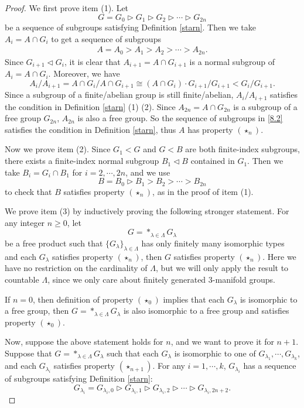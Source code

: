\documentclass{amsart}
\numberwithin{equation}{section}
\theoremstyle{definition}
\begin{document}
\begin{proof}
We first prove item (1). Let 
$$G=G_0\vartriangleright G_1\vartriangleright G_2\vartriangleright \cdots \vartriangleright G_{2n}$$
be a sequence of subgroups satisfying Definition \ref{starn}. Then we take $A_i=A\cap G_i$ to get a sequence of subgroups
\begin{align}\label{8.2}
A=A_0>A_1>A_2>\cdots>A_{2n}.
\end{align}
Since $G_{i+1}\vartriangleleft  G_i$, it is clear that $A_{i+1}=A\cap G_{i+1}$ is a normal subgroup of $A_i=A\cap G_i$.
Moreover, we have
$$A_i/A_{i+1}=A\cap G_i/A\cap G_{i+1}\cong (A\cap G_i)\cdot G_{i+1}/G_{i+1}<G_i/G_{i+1}.$$
Since a subgroup of a finite/abelian group is still finite/abelian, $A_i/A_{i+1}$ satisfies the condition in Definition \ref{starn} (1) (2). Since $A_{2n}=A\cap G_{2n}$ is a subgroup of a free group $G_{2n}$, $A_{2n}$ is also a free group. So the sequence of subgroups in \eqref{8.2} satisfies the condition in Definition \ref{starn}, thus $A$ has property $(\star_n)$.

Now we prove item (2). Since $G_1<G$ and $G<B$ are both finite-index subgroups, there exists a finite-index normal subgroup $B_1\vartriangleleft B$ contained in $G_1$. Then we take $B_i=G_i\cap B_1$ for $i=2,\cdots,2n$, and we use 
$$B=B_0\vartriangleright B_1>B_2>\cdots>B_{2n}$$ 
to check that $B$ satisfies property $(\star_n)$, as in the proof of item (1). 

We prove item (3) by inductively proving the following stronger statement. For any integer $n\geq 0$, let $$G=*_{\lambda\in \Lambda}G_{\lambda}$$
be a free product such that $\{G_{\lambda}\}_{\lambda\in \Lambda}$ has only finitely many isomorphic types and each $G_{\lambda}$ satisfies property $(\star_n)$, then $G$ satisfies property $(\star_n)$. Here we have no restriction on the cardinality of $\Lambda$, but we will only apply the result to countable $\Lambda$, since we only care about finitely generated $3$-manifold groups.

If $n=0$, then definition of property $(\star_0)$ implies that each $G_{\lambda}$ is isomorphic to a free group, then $G=*_{\lambda\in \Lambda}G_{\lambda}$ is also isomorphic to a free group and satisfies property $(\star_0)$.

Now, suppose the above statement holds for $n$, and we want to prove it for $n+1$. Suppose that $G=*_{\lambda\in \Lambda}G_{\lambda}$ such that each $G_{\lambda}$ is isomorphic to one of $G_{\lambda_1},\cdots,G_{\lambda_k}$, and each $G_{\lambda_i}$ satisfies property $(\star_{n+1})$. For any $i=1,\cdots,k$, $G_{\lambda_i}$ has a sequence of subgroups satisfying Definition \ref{starn}:
$$G_{\lambda_i}=G_{\lambda_i,0}\vartriangleright G_{\lambda_i,1}\vartriangleright G_{\lambda_i,2}\vartriangleright \cdots \vartriangleright G_{\lambda_i,2n+2}.$$


\end{proof}
\end{document}
